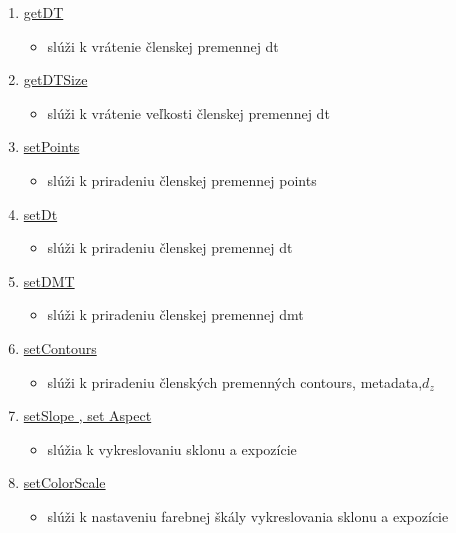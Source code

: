 \documentclass[12pt]{article}
\begin{document}
\begin{enumerate}
\item[] \underline{getDT}
\begin{itemize}
\item slúži k vrátenie členskej premennej dt
\end{itemize}

\item[] \underline{getDTSize}
\begin{itemize}
\item slúži k vrátenie veľkosti členskej premennej dt
\end{itemize}

\item[] \underline{setPoints}
\begin{itemize}
\item slúži k priradeniu členskej premennej points
\end{itemize}

\item[] \underline{setDt}
\begin{itemize}
\item slúži k priradeniu členskej premennej dt
\end{itemize}

\item[] \underline{setDMT}
\begin{itemize}
\item slúži k priradeniu členskej premennej dmt
\end{itemize}

\item[] \underline{setContours}
\begin{itemize}
\item slúži k priradeniu členských premenných contours, metadata,$ d_z $
\end{itemize}

\item[] \underline{setSlope , set Aspect}
\begin{itemize}
\item slúžia k vykreslovaniu sklonu a expozície
\end{itemize}

\item[] \underline{setColorScale}
\begin{itemize}
\item slúži k nastaveniu farebnej škály vykreslovania sklonu a expozície
\end{itemize}

\end{enumerate}
\end{document}
